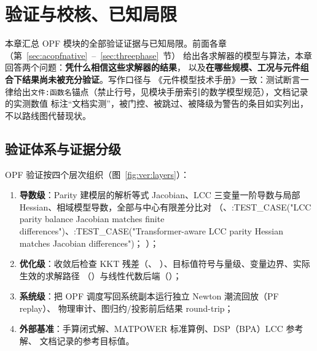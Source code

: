 \section{验证与校核、已知局限}\label{sec:verification}

本章汇总 OPF 模块的全部验证证据与已知局限。前面各章（第~\ref{sec:acopfnative}~--~\ref{sec:threephase}~节）
给出各求解器的模型与算法，本章回答两个问题：\textbf{凭什么相信这些求解器的结果}，
以及\textbf{在哪些规模、工况与元件组合下结果尚未被充分验证}。写作口径与
《元件模型技术手册》一致：测试断言一律给出\texttt{文件:函数名}锚点（禁止行号，见模块手册索引的数学模型规范），文档记录的实测数值
标注“文档实测”，被门控、被跳过、被降级为警告的条目如实列出，不以路线图代替现状。

\subsection{验证体系与证据分级}\label{subsec:ver:layers}

OPF 验证按四个层次组织（图~\ref{fig:ver:layers}）：

\begin{enumerate}
  \item \textbf{导数级}：Parity 建模层的解析等式 Jacobian、LCC 三变量一阶导数与局部
        Hessian、相域模型导数，全部与中心有限差分比对
        （、:TEST\_CASE("LCC parity balance Jacobian matches finite differences")、:TEST\_CASE("Transformer-aware LCC parity Hessian matches Jacobian differences")；
        ）；
  \item \textbf{优化级}：收敛后检查 KKT 残差（、
        ）、目标值符号与量级、变量边界、实际生效的求解路径
        （）与线性代数后端（）；
  \item \textbf{系统级}：把 OPF 调度写回系统副本运行独立 Newton 潮流回放（PF replay）、
         物理审计、图归约/投影前后结果 round-trip；
  \item \textbf{外部基准}：手算闭式解、MATPOWER 标准算例、DSP（BPA）LCC 参考解、
        文档记录的参考目标值。
\end{enumerate}

